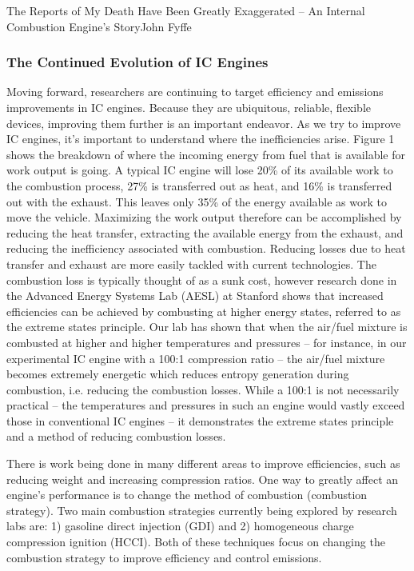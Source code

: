 \documentclass{papertex}
\begin{document}
\begin{news}{2}{The Reports of My Death Have Been Greatly Exaggerated -- An Internal Combustion Engine’s Story}{John Fyffe}{}{}
\subsubsection*{The Continued Evolution of IC Engines}

Moving forward, researchers are continuing to target efficiency and emissions 
improvements in IC engines.  Because they are ubiquitous, reliable, flexible 
devices, improving them further is an important endeavor.  As we try to 
improve IC engines, it’s important to understand where the inefficiencies 
arise.  Figure 1 shows the breakdown of where the incoming energy from fuel 
that is available for work output is going. A typical IC engine will lose 
20\% of its available work to the combustion process, 27\% is transferred 
out as heat, and 16\% is transferred out with the exhaust. This leaves only 
35\% of the energy available as work to move the vehicle.  Maximizing the work 
output therefore can be accomplished by reducing the heat transfer, 
extracting the available energy from the exhaust, and reducing the 
inefficiency associated with combustion.  Reducing losses due to heat transfer 
and exhaust are more easily tackled with current technologies.  The 
combustion loss is typically thought of as a sunk cost, however research 
done in the Advanced Energy Systems Lab (AESL) at Stanford shows that 
increased efficiencies can be achieved by combusting at higher energy states, 
referred to as the extreme states principle.  Our lab has shown that when the 
air/fuel mixture is combusted at higher and higher temperatures and 
pressures – for instance, in our experimental IC engine with a 100:1 
compression ratio – the air/fuel mixture becomes extremely energetic which 
reduces entropy generation during combustion, i.e. reducing the combustion 
losses.  While a 100:1 is not necessarily practical – the temperatures and 
pressures in such an engine would vastly exceed those in conventional IC 
engines – it demonstrates the extreme states principle and a method of 
reducing combustion losses.

There is work being done in many different areas to improve efficiencies, 
such as reducing weight and increasing compression ratios. One way to greatly 
affect an engine’s performance is to change the method of combustion 
(combustion strategy).  Two main combustion strategies currently being 
explored by research labs are: 1) gasoline direct injection (GDI) and 2) 
homogeneous charge compression ignition (HCCI).  Both of these techniques 
focus on changing the combustion strategy to improve efficiency and control 
emissions.


\end{news}
\end{document}
